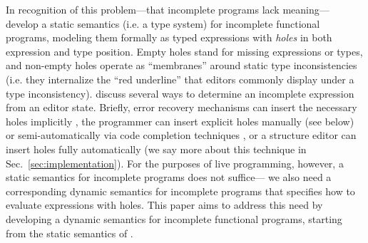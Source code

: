
In recognition of this problem---that incomplete programs lack meaning---%
\citet{popl-paper} develop a static semantics (i.e. a type system) for incomplete 
functional programs, modeling them formally as typed expressions with \emph{holes} in 
both expression and type position. 
Empty holes stand for missing expressions or types,
and non-empty holes operate as ``membranes'' around static type inconsistencies 
(i.e. they internalize the ``red underline'' that editors commonly display under a type inconsistency).
\citet{popl-paper,HazelnutSNAPL} discuss several ways to determine an incomplete expression from an editor state. 
Briefly, error recovery mechanisms can insert the necessary holes implicitly \cite{DBLP:journals/siamcomp/AhoP72,charles1991practical,graham1979practical,DBLP:conf/oopsla/KatsJNV09,DBLP:conf/oopsla/KatsV10},
the programmer can insert explicit holes manually (see below) 
or semi-automatically via code completion techniques \cite{Amorim2016}, 
or a structure editor can insert holes fully automatically \cite{popl-paper} (we say more about this technique in Sec.~\ref{sec:implementation}).
%
For the purposes of live programming, however, a static semantics for incomplete programs does not suffice---%
we also need a corresponding dynamic semantics for incomplete programs that specifies how to evaluate expressions with holes. This paper aims to address this need by developing
a {dynamic semantics} for incomplete functional programs, 
starting from the static semantics of \citet{popl-paper}.
%

